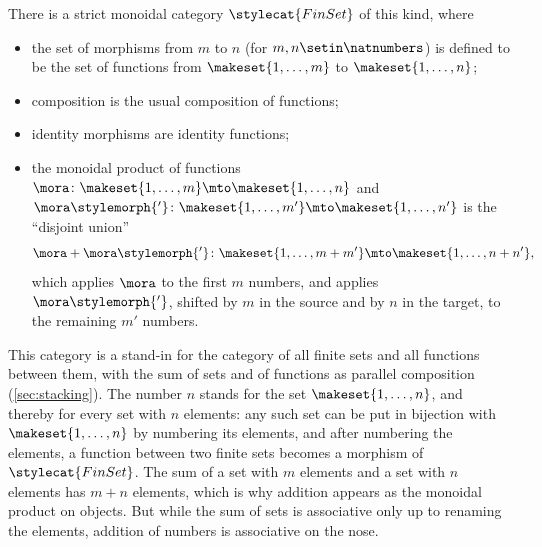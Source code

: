 \begin{example}
    \label{exa:prop-finset}
    There is a strict monoidal category $\stylecat{FinSet}$ of this kind, where
    \begin{itemize}
        \item the set of morphisms from $m$ to $n$ (for $m, n \setin \natnumbers$) is defined to be the set of functions from $\makeset{1, \dots, m}$ to $\makeset{1, \dots, n}$;
        \item composition is the usual composition of functions;
        \item identity morphisms are identity functions;
        \item the monoidal product of functions $\mora \colon \makeset{1, \dots, m} \mto \makeset{1, \dots, n}$ and $\mora\stylemorph{'} \colon \makeset{1, \dots, m'} \mto \makeset{1, \dots, n'}$ is the ``disjoint union''
              \begin{equation}
                  \mora + \mora\stylemorph{'} \colon \makeset{1, \dots, m + m'} \mto \makeset{1, \dots, n + n'},
              \end{equation}
              which applies $\mora$ to the first $m$ numbers, and applies $\mora\stylemorph{'}$, shifted by $m$ in the source and by $n$ in the target, to the remaining $m'$ numbers.
    \end{itemize}

    This category is a stand-in for the category of all finite sets and all functions between them, with the sum of sets and of functions as parallel composition (\cref{sec:stacking}).
    The number $n$ stands for the set $\makeset{1, \dots, n}$, and thereby for every set with $n$ elements: any such set can be put in bijection with $\makeset{1, \dots, n}$ by numbering its elements, and after numbering the elements, a function between two finite sets becomes a morphism of $\stylecat{FinSet}$.
    The sum of a set with $m$ elements and a set with $n$ elements has $m + n$ elements, which is why addition appears as the monoidal product on objects.
    But while the sum of sets is associative only up to renaming the elements, addition of numbers is associative on the nose.
\end{example}

